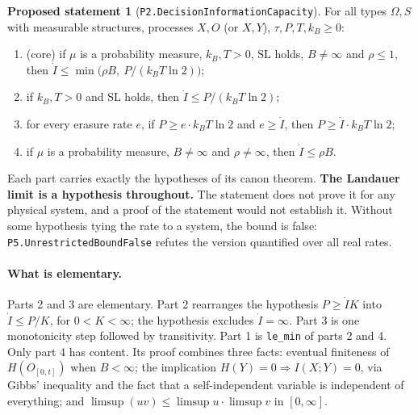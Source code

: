 \documentclass[11pt]{article}
\theoremstyle{definition}
\newtheorem{proposal}[theorem]{Proposed statement}
\theoremstyle{remark}
\begin{document}
\begin{proposal}[\texttt{P2.DecisionInformationCapacity}]
For all types $\Omega,S$ with measurable structures, processes $X,O$ (or $X,Y$), $\tau,P,T,k_B\ge0$:
\begin{enumerate}
\item (core) if $\mu$ is a probability measure, $k_B,T>0$, $\mathrm{SL}$ holds, $B\ne\infty$ and $\rho\le1$, then
$\dot I\le\min\bigl(\rho B,\ P/(k_BT\ln2)\bigr)$;
\item if $k_B,T>0$ and $\mathrm{SL}$ holds, then $\dot I\le P/(k_BT\ln2)$;
\item for every erasure rate $e$, if $P\ge e\cdot k_BT\ln 2$ and $e\ge\dot I$, then $P\ge\dot I\cdot k_BT\ln2$;
\item if $\mu$ is a probability measure, $B\ne\infty$ and $\rho\ne\infty$, then $\dot I\le\rho B$.
\end{enumerate}
\end{proposal}
Each part carries exactly the hypotheses of its canon theorem.
\textbf{The Landauer limit is a hypothesis throughout.} The statement does not prove it for any physical system, and a
proof of the statement would not establish it. Without some hypothesis tying the rate to a system, the bound is false:
\texttt{P5.UnrestrictedBoundFalse} refutes the version quantified over all real rates.

\paragraph{What is elementary.} Parts 2 and 3 are elementary. Part 2 rearranges the hypothesis $P\ge\dot I K$ into
$\dot I\le P/K$, for $0<K<\infty$; the hypothesis excludes $\dot I=\infty$. Part 3 is one monotonicity step followed by
transitivity. Part 1 is \texttt{le\_min} of parts 2 and 4. Only part 4 has content. Its proof combines three facts: eventual
finiteness of $H(O_{[0,t]})$ when $B<\infty$; the implication $H(Y)=0\Rightarrow I(X;Y)=0$, via Gibbs' inequality and the fact
that a self-independent variable is independent of everything; and $\limsup(uv)\le\limsup u\cdot\limsup v$ in $[0,\infty]$.
\end{document}
